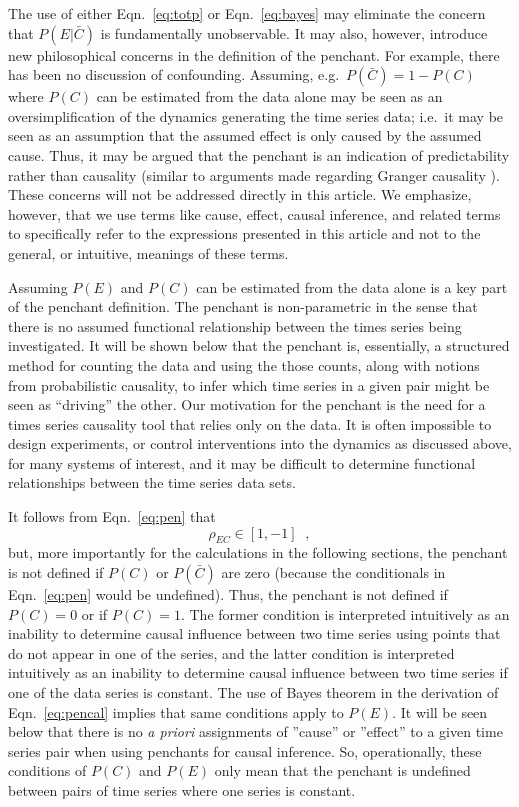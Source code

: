 \documentclass[a4paper,11pt,twocolumn]{article}
\begin{document}
The use of either Eqn.\ \ref{eq:totp} or Eqn.\ \ref{eq:bayes} may eliminate the concern that $P(E|\bar{C})$ is fundamentally unobservable.  It may also, however, introduce new philosophical concerns in the definition of the penchant.  For example, there has been no discussion of confounding.  Assuming, e.g.\  $P(\bar{C})=1-P(C)$ where $P(C)$ can be estimated from the data alone may be seen as an oversimplification of the dynamics generating the time series data; i.e.\ it may be seen as an assumption that the assumed effect is only caused by the assumed cause.  Thus, it may be argued that the penchant is an indication of predictability rather than causality (similar to arguments made regarding Granger causality \cite{Sugihara2012}).  These concerns will not be addressed directly in this article.  We emphasize, however, that we use terms like cause, effect, causal inference, and related terms to specifically refer to the expressions presented in this article and not to the general, or intuitive, meanings of these terms.

Assuming $P(E)$ and $P(C)$ can be estimated from the data alone is a key part of the penchant definition.  The penchant is non-parametric in the sense that there is no assumed functional relationship between the times series being investigated.  It will be shown below that the penchant is, essentially, a structured method for counting the data and using the those counts, along with notions from probabilistic causality, to infer which time series in a given pair might be seen as ``driving'' the other.  Our motivation for the penchant is the need for a times series causality tool that relies only on the data.  It is often impossible to design experiments, or control interventions into the dynamics as discussed above, for many systems of interest, and it may be difficult to determine functional relationships between the time series data sets.

It follows from Eqn.\ \ref{eq:pen} that
\begin{equation}
\rho_{EC}\in\left[1,-1\right]\;\;,
\end{equation}
but, more importantly for the calculations in the following sections, the penchant is not defined if $P(C)$ or $P(\bar{C})$ are zero (because the conditionals in Eqn.\ \ref{eq:pen} would be undefined).  Thus, the penchant is not defined if $P(C)=0$ or if $P(C)=1$.  The former condition is interpreted intuitively as an inability to determine causal influence between two time series using points that do not appear in one of the series, and the latter condition is interpreted intuitively as an inability to determine causal influence between two time series if one of the data series is constant.  The use of Bayes theorem in the derivation of Eqn.\ \ref{eq:pencal} implies that same conditions apply to $P(E)$.  It will be seen below that there is no {\em a priori} assignments of ''cause'' or ''effect'' to a given time series pair when using penchants for causal inference.  So, operationally, these conditions of $P(C)$ and $P(E)$ only mean that the penchant is undefined between pairs of time series where one series is constant. 
\end{document}
